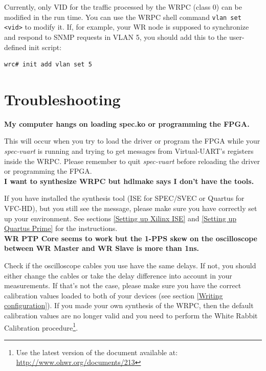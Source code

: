 \documentclass[a4paper, 12pt]{article}
\renewcommand{\_}{\underscore\allowbreak}
\begin{document}
Currently, only VID for the traffic processed by the WRPC (class 0) can be
modified in the run time. You can use the WRPC shell command
\texttt{vlan set <vid>} to modify it. If, for example, your WR node is supposed
to synchronize and respond to SNMP requests in VLAN 5, you should add this to
the user-defined init script:
\begin{lstlisting}
wrc# init add vlan set 5
\end{lstlisting}

\newpage






\newpage
\section{Troubleshooting}
\label{Troubleshooting}

\textbf{My computer hangs on loading spec.ko or programming the FPGA.}

This will occur when you try to load the driver or program the FPGA while your
\textit{spec-vuart} is running and trying to get messages from Virtual-UART's
registers inside the WRPC. Please remember to quit \textit{spec-vuart} before
reloading the driver or programming the FPGA.\\

\noindent \textbf{I want to synthesize WRPC but hdlmake says I don't have the
tools.}

If you have installed the synthesis tool (ISE for SPEC/SVEC or Quartus for
VFC-HD), but you still see the message, please make sure you have correctly set
up your environment. See sections \ref{Setting up Xilinx ISE} and \ref{Setting
up Quartus Prime} for the instructions.\\

\noindent \textbf{WR PTP Core seems to work but the 1-PPS skew on the
oscilloscope between WR Master and WR Slave is more than 1ns.}

Check if the oscilloscope cables you use have the same delays. If not, you
should either change the cables or take the delay difference into account in your
measurements. If that's not the case, please make sure you have the correct
calibration values loaded to both of your devices (see section \ref{Writing
configuration}). If you made your own synthesis of the WRPC, then the default
calibration values are no longer valid and you need to perform the White Rabbit
Calibration procedure\footnote{Use the latest version of the document available
at: \url{http://www.ohwr.org/documents/213}}.
\end{document}

